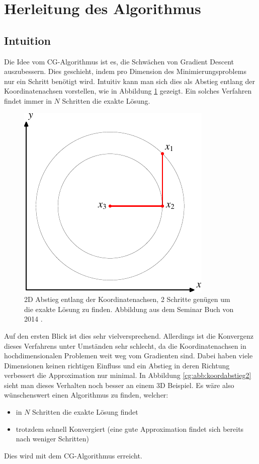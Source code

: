 \section{Herleitung des Algorithmus}
\label{cg:section:herleitung}

\subsection{Intuition}
Die Idee vom CG-Algorithmus ist es, die Schwächen von Gradient Descent auszubessern.
Dies geschieht, indem pro Dimension des Minimierungsproblems nur ein Schritt benötigt wird.
Intuitiv kann man sich dies als Abstieg entlang der Koordinatenachsen vorstellen, wie in Abbildung \ref{cg:abb:koordabstieg} gezeigt.
Ein solches Verfahren findet immer in $N$ Schritten die exakte Lösung.

\begin{figure}	
	\centering
	\includegraphics{papers/cg/images/descent-2}
	\caption{2D Abstieg entlang der Koordinatenachsen, 2 Schritte genügen um die exakte Lösung zu finden. 
		Abbildung aus dem Seminar Buch von 2014 \cite{cg:book:hpc}.}
	\label{cg:abb:koordabstieg}
\end{figure}

Auf den ersten Blick ist dies sehr vielversprechend.
Allerdings ist die Konvergenz dieses Verfahrens unter Umständen sehr schlecht, da die Koordinatenachsen in hochdimensionalen Problemen weit weg vom Gradienten sind.
Dabei haben viele Dimensionen keinen richtigen Einfluss und ein Abstieg in deren Richtung verbessert die Approximation nur minimal.
In Abbildung \ref{cg:abb:koordabstieg2} sieht man dieses Verhalten noch besser an einem 3D Beispiel.
Es wäre also wünschenswert einen Algorithmus zu finden, welcher:
\begin{itemize}
	\item in $N$ Schritten die exakte Lösung findet
	\item trotzdem schnell Konvergiert (eine gute Approximation findet sich bereits nach weniger Schritten)
\end{itemize}
Dies wird mit dem CG-Algorithmus erreicht.

